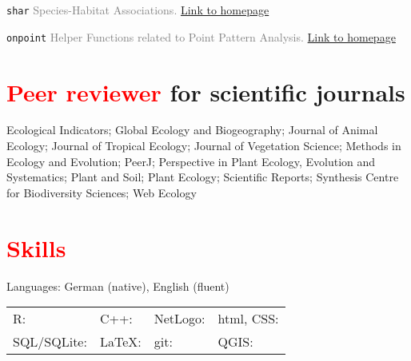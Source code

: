 \documentclass[10pt, hidelinks]{report}
\begin{document}
\texttt{shar} \textcolor{grey}{Species-Habitat Associations.}
\hfill
\textcolor{blue}{\href{https://r-sptialecology.github.io/shar/}{Link to homepage}}

\texttt{onpoint} \textcolor{grey}{Helper Functions related to Point Pattern Analysis.}
\hfill
\textcolor{blue}{\href{https://r-spatialecology.github.io/onpoint/}{Link to homepage}}


\section*{\textcolor{red}{Peer reviewer} for scientific journals \sout{\hfill}}

Ecological Indicators;
Global Ecology and Biogeography;
Journal of Animal Ecology;
Journal of Tropical Ecology;
Journal of Vegetation Science;
Methods in Ecology and Evolution;
PeerJ;
Perspective in Plant Ecology, Evolution and Systematics;
Plant and Soil;
Plant Ecology;
Scientific Reports;
Synthesis Centre for Biodiversity Sciences;
Web Ecology


\section*{\textcolor{red}{Skills} \sout{\hfill}}

Languages: German (native), English (fluent)

\vspace{7.5mm}

\begin{center}
	\begin{tabular}{l l l l}
		
		R: \textcolor{blue}{\faCircle \faCircle \faCircle \faCircle \faCircle} & 
		C++: \textcolor{blue}{\faCircle \faCircle \faCircleO \faCircleO \faCircleO} & 
		NetLogo: \textcolor{blue}{\faCircle \faCircle \faCircleO \faCircleO \faCircleO} &
		html, CSS: \textcolor{blue}{\faCircle \faCircleO \faCircleO \faCircleO \faCircleO} \\
	
		SQL/SQLite: \textcolor{blue}{\faCircle \faCircleO \faCircleO \faCircleO \faCircleO} &
		LaTeX: \textcolor{blue}{\faCircle \faCircle \faCircle \faCircleO \faCircleO} &
		git: \textcolor{blue}{\faCircle \faCircle \faCircle \faCircleO \faCircleO} &
		QGIS: \textcolor{blue}{\faCircle \faCircle \faCircleO \faCircleO \faCircleO} \\

	\end{tabular}
\end{center}
\end{document}
